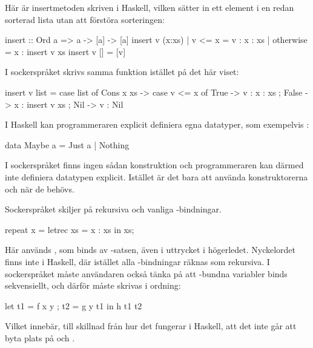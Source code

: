 \documentclass[Rapport]{subfiles}
\begin{document}
Här är insertmetoden skriven i Haskell, vilken sätter in ett element i en redan sorterad
lista utan att förstöra sorteringen:

\begin{codeEx}
  insert :: Ord a => a -> [a] -> [a]
  insert v (x:xs) 
      | v <= x    = v : x : xs
      | otherwise = x : insert v xs 
  insert v [] = [v]
\end{codeEx}                  

I sockerspråket skrivs samma funktion istället på det här viset:

\begin{codeEx}
  insert v list = case list of
      { Cons x xs -> case v <= x of
          { True  -> v : x : xs
          ; False -> x : insert v xs
          }
      ; Nil -> v : Nil
      }
\end{codeEx}

I Haskell kan programmeraren explicit definiera egna datatyper, som exempelvis :
    
\begin{codeEx}
data Maybe a = Just a | Nothing
\end{codeEx}

I sockerspråket finns ingen sådan konstruktion och programmeraren kan därmed inte
definiera datatypen explicit. Istället är det bara att använda
konstruktorerna  och  när de behövs.


Sockerspråket skiljer på rekursiva och vanliga -bindningar. 

\begin{codeEx}
repeat x = letrec xs = x : xs in xs;
\end{codeEx}

Här används , som binds av -satsen, även i uttrycket i högerledet.
Nyckelordet  finns inte i Haskell, där istället alla -bindningar räknas som rekursiva. I
sockerspråket måste användaren också tänka på att -bundna variabler binds
sekvensiellt, och därför måste skrivas i ordning:

\begin{codeEx}
let { t1 = f x y
    ; t2 = g y t1
    }
in  h t1 t2
\end{codeEx}

Vilket innebär, till skillnad från hur det fungerar i Haskell, att det inte går att byta plats på  och .
\end{document}
